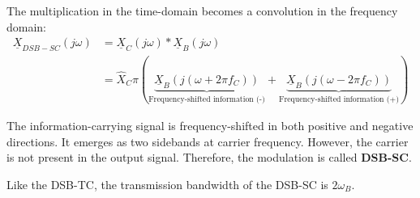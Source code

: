 \begin{refsection}
The multiplication in the time-domain becomes a convolution in the frequency domain:
\begin{equation}
	\begin{split}
		\underline{X}_{DSB-SC}\left(j\omega\right) &= \underline{X}_C\left(j\omega\right) * \underline{X}_B\left(j\omega\right) \\
		 &= \hat{X}_C \pi \left( \underbrace{\underline{X}_B\left(j\left(\omega + 2 \pi f_C\right)\right)}_{\text{Frequency-shifted information (-)}} + \underbrace{\underline{X}_B\left(j\left(\omega - 2 \pi f_C\right)\right)}_{\text{Frequency-shifted information (+)}} \right)
	\end{split}
\end{equation}

The information-carrying signal is frequency-shifted in both positive and negative directions. It emerges as two sidebands at carrier frequency. However, the carrier is not present in the output signal. Therefore, the modulation is called  \textbf{\acf{DSB-SC}}.

Like the \ac{DSB-TC}, the transmission bandwidth of the \ac{DSB-SC} is $2 \omega_B$.

\begin{figure}[H]
	

\end{figure}
\end{refsection}
